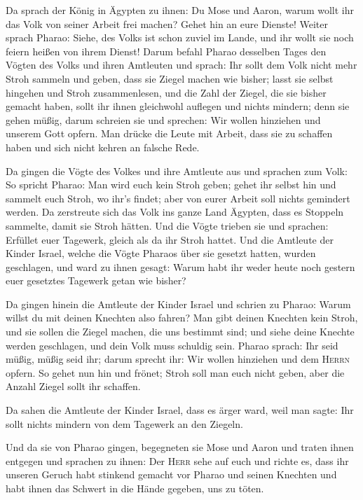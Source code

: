  Da sprach der König in Ägypten zu ihnen: Du Mose und
Aaron, warum wollt ihr das Volk von seiner Arbeit frei machen? Gehet hin
an eure Dienste!  Weiter sprach Pharao: Siehe, des Volks
ist schon zuviel im Lande, und ihr wollt sie noch feiern heißen von
ihrem Dienst!  Darum befahl Pharao desselben Tages den
Vögten des Volks und ihren Amtleuten und sprach:  Ihr
sollt dem Volk nicht mehr Stroh sammeln und geben, dass sie Ziegel
machen wie bisher; lasst sie selbst hingehen und Stroh zusammenlesen,
 und die Zahl der Ziegel, die sie bisher gemacht haben,
sollt ihr ihnen gleichwohl auflegen und nichts mindern; denn sie gehen
müßig, darum schreien sie und sprechen: Wir wollen hinziehen und unserem
Gott opfern.  Man drücke die Leute mit Arbeit, dass sie zu
schaffen haben und sich nicht kehren an falsche Rede.

 Da gingen die Vögte des Volkes und ihre Amtleute aus und
sprachen zum Volk: So spricht Pharao: Man wird euch kein Stroh geben;
 gehet ihr selbst hin und sammelt euch Stroh, wo ihr's
findet; aber von eurer Arbeit soll nichts gemindert werden.
 Da zerstreute sich das Volk ins ganze Land Ägypten, dass
es Stoppeln sammelte, damit sie Stroh hätten.  Und die
Vögte trieben sie und sprachen: Erfüllet euer Tagewerk, gleich als da
ihr Stroh hattet.  Und die Amtleute der Kinder Israel,
welche die Vögte Pharaos über sie gesetzt hatten, wurden geschlagen, und
ward zu ihnen gesagt: Warum habt ihr weder heute noch gestern euer
gesetztes Tagewerk getan wie bisher?

 Da gingen hinein die Amtleute der Kinder Israel und
schrien zu Pharao: Warum willst du mit deinen Knechten also fahren?
 Man gibt deinen Knechten kein Stroh, und sie sollen die
Ziegel machen, die uns bestimmt sind; und siehe deine Knechte werden
geschlagen, und dein Volk muss schuldig sein.  Pharao
sprach: Ihr seid müßig, müßig seid ihr; darum sprecht ihr: Wir wollen
hinziehen und dem \textsc{Herrn} opfern.  So gehet nun
hin und frönet; Stroh soll man euch nicht geben, aber die Anzahl Ziegel
sollt ihr schaffen.

 Da sahen die Amtleute der Kinder Israel, dass es ärger
ward, weil man sagte: Ihr sollt nichts mindern von dem Tagewerk an den
Ziegeln.

 Und da sie von Pharao gingen, begegneten sie Mose und
Aaron und traten ihnen entgegen  und sprachen zu ihnen:
Der \textsc{Herr} sehe auf euch und richte es, dass ihr unseren Geruch
habt stinkend gemacht vor Pharao und seinen Knechten und habt ihnen das
Schwert in die Hände gegeben, uns zu töten.

